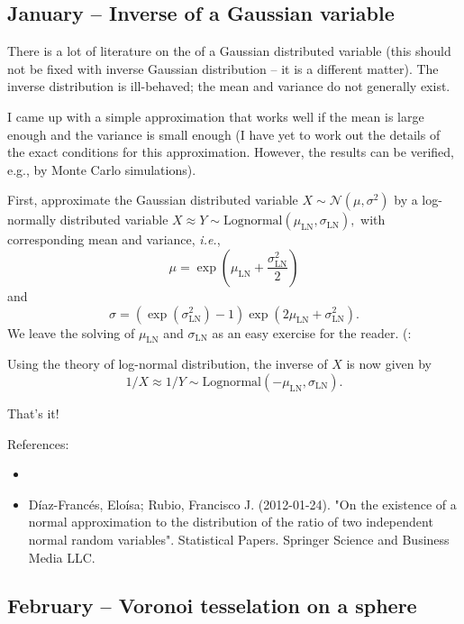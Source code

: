 \documentclass{article}
\begin{document}
\subsection{January – Inverse of a Gaussian variable}

There is a lot of literature on the  of a Gaussian distributed variable (this should not be fixed with inverse Gaussian distribution – it is a different matter). The inverse distribution is ill-behaved; the mean and variance do not generally exist.

I came up with a simple approximation that works well if the mean is large enough and the variance is small enough (I have yet to work out the details of the exact conditions for this approximation. However, the results can be verified, e.g., by Monte Carlo simulations).

First, approximate the Gaussian distributed variable $X \sim \mathcal{N}(\mu, \sigma^2)$ by a log-normally distributed variable $X \approx Y \sim \text{Lognormal}(\mu_{\text{LN}}, \sigma_{\text{LN}}),$ with corresponding mean and variance, \textit{i.e.}, $$\mu = \exp\left( \mu_{\text{LN}} + \frac{\sigma_{\text{LN}}^2}{2} \right)$$ and
$$\sigma = (\exp( \sigma_{\text{LN}}^2) - 1)\exp(2 \mu_{\text{LN}} + \sigma_{\text{LN}}^2).$$ We leave the solving of $\mu_{\text{LN}}$ and $\sigma_{\text{LN}}$ as an easy exercise for the reader. (:


Using the theory of log-normal distribution, the inverse of $X$ is now given by
$$
1/X \approx 1/Y \sim \text{Lognormal}(-\mu_{\text{LN}}, \sigma_{\text{LN}}).
$$

That's it!



References:
\begin{itemize}
\item {}
\item  Díaz-Francés, Eloísa; Rubio, Francisco J. (2012-01-24). "On the existence of a normal approximation to the distribution of the ratio of two independent normal random variables". Statistical Papers. Springer Science and Business Media LLC.
\end{itemize}


\subsection{February – Voronoi tesselation on a sphere}
\end{document}
